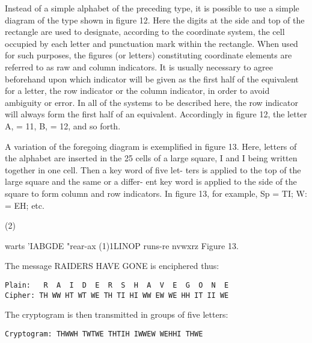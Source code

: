 \mypara Instead of a simple alphabet of the preceding type, it is possible
to use a simple diagram of the type shown in ﬁgure 12. Here the digits
at the side and top of the rectangle are used to designate, according to
the coordinate system, the cell occupied by each letter and punctuation
mark within the rectangle. When used for such purposes, the ﬁgures (or
letters) constituting coordinate elements are referred to as raw and
column indicators. It is usually necessary to agree beforehand upon
which indicator will be given as the ﬁrst half of the equivalent for a
letter, the row indicator or the column indicator, in order to avoid
ambiguity or error. In all of the systems to be described here, the row
indicator will always form the ﬁrst half of an equivalent. Accordingly
in ﬁgure 12, the letter A, = 11, B, = 12, and so forth.

\mypara A variation of the foregoing diagram is exempliﬁed in ﬁgure 13.
Here, letters of the alphabet are inserted in the 25 cells of a large square,
I and I being written together in one cell. Then a key word of ﬁve let-
ters is applied to the top of the large square and the same or a differ-
ent key word is applied to the side of the square to form column and row
indicators. In ﬁgure 13, for example, Sp = TI; W: = EH; etc.


(2)

 

 

 

 

 

 

 

 

 

 

 

 

warts
'IABGDE
"rear-ax
(1)1LINOP
runs-re
nvwxrz
Figure 13.

The message RAIDERS HAVE GONE is enciphered thus:

\begin{verbatim}
Plain:   R  A  I  D  E  R  S  H  A  V  E  G  O  N  E
Cipher: TH WW HT WT WE TH TI HI WW EW WE HH IT II WE
\end{verbatim}

The cryptogram is then transmitted in groups of ﬁve letters:
\begin{verbatim}
Cryptogram: THWWH TWTWE THTIH IWWEW WEHHI THWE
\end{verbatim}

